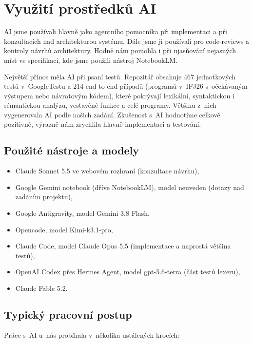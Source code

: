 \documentclass[a4paper,11pt]{article}
\begin{document}
\section{Využití prostředků AI}
\label{sec:ai}
AI jsme používali hlavně jako agentního pomocníka při implementaci a při
konzultacích nad architekturou systému. Dále jsme ji používali pro code-reviews a kontroly návrhů architektury. Hodně nám pomohla i při ujasňování
nejasných míst ve specifikaci, kde jsme použili nástroj NotebookLM.

Největší přínos měla AI při psaní testů. Repozitář obsahuje 467 jednotkových
testů v~GoogleTestu a 214 end-to-end případů (programů v~IFJ26 s~očekávaným
výstupem nebo návratovým kódem), které pokrývají lexikální, syntaktickou
i sémantickou analýzu, vestavěné funkce a celé programy. Většinu z~nich
vygenerovala AI podle našich zadání. Zkušenost s~AI hodnotíme celkově
pozitivně, výrazně nám zrychlila hlavně implementaci a testování.

\subsection{Použité nástroje a modely}
\begin{itemize}
  \item Claude Sonnet 5.5 ve webovém rozhraní (konzultace návrhu),
  \item Google Gemini notebook (dříve NotebookLM), model neuveden
        (dotazy nad zadáním projektu),
  \item Google Antigravity, model Gemini 3.8 Flash,
  \item Opencode, model Kimi-k3.1-pro,
  \item Claude Code, model Claude Opus 5.5 (implementace a naprostá většina
        testů),
  \item OpenAI Codex přes Hermes Agent, model gpt-5.6-terra (část testů
        lexeru),
  \item Claude Fable 5.2.
\end{itemize}

\subsection{Typický pracovní postup}
Práce s~AI u~nás probíhala v~několika ustálených krocích:
\end{document}
